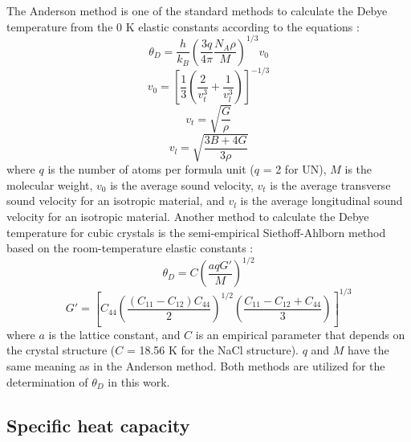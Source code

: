 \documentclass[preprint, 12pt]{elsarticle}
\begin{document}
The Anderson method is one of the standard methods to calculate the Debye temperature from the 0 K elastic constants according to the equations \cite{Anderson1963}:
\begin{equation}
\theta_D = \frac{h}{k_B} \left( \frac{3 q}{4 \pi} \frac{N_A \rho}{M} \right)^{1/3} v_0
\label{Eq:DebyeSoundVel}
\end{equation}
\begin{equation}
v_0 = \left[  \frac{1}{3} \left( \frac{2}{v_t^3} + \frac{1}{v_l^3} \right) \right]^{-1/3}
\label{Eq:v_m}
\end{equation}
\begin{equation}
v_t = \sqrt{\frac{G}{\rho}}
\end{equation}
\begin{equation}
v_l = \sqrt{\frac{3 B + 4 G}{3 \rho}}
\end{equation}
where $q$ is the number of atoms per formula unit ($q$ = 2 for UN), $M$ is the molecular weight, $v_0$ is the average sound velocity, $v_t$ is the average transverse sound velocity for an isotropic material, and $v_l$ is the average longitudinal sound velocity for an isotropic material. Another method to calculate the Debye temperature for cubic crystals is the semi-empirical Siethoff-Ahlborn method based on the room-temperature elastic constants \cite{Siethoff1995}:
\begin{equation}
\theta_D = C \left( \frac{aqG'}{M} \right)^{1/2}
\label{Eq:Blackman}
\end{equation}
\begin{equation}
G' = \left[C_{44} \left(\frac{(C_{11}-C_{12}) C_{44}}{2}\right)^{1/2} \left(\frac{C_{11}-C_{12}+C_{44}}{3}\right)\right]^{1/3}
\end{equation}
where $a$ is the lattice constant, and $C$ is an empirical parameter that depends on the crystal structure ($C$ = 18.56 K for the NaCl structure). $q$ and $M$ have the same meaning as in the Anderson method. Both methods are utilized for the determination of $\theta_D$ in this work.

\subsection{Specific heat capacity}
\end{document}
